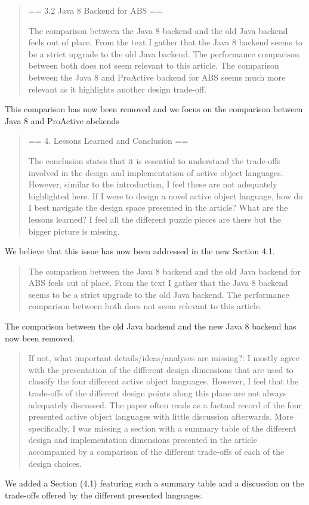 \documentclass{article}
\begin{document}
\begin{quote}
	== 3.2 Java 8 Backend for ABS ==

The comparison between the Java 8 backend and the old Java backend feels out of place. 
From the text I gather that the Java 8 backend seems to be a strict upgrade to the old 
Java backend. The performance comparison between both does not seem relevant to this 
article.
The comparison between the Java 8 and ProActive backend for ABS seems much more relevant 
as it highlights another design trade-off.
\end{quote}
This comparison has now been removed and we focus on the comparison between Java 8 and 
ProActive abckends

\begin{quote}
	== 4. Lessons Learned and Conclusion ==

The conclusion states that it is essential to understand the trade-offs involved in the 
design and implementation of active object languages. However, similar to the 
introduction, I feel these are not adequately highlighted here. If I were to design a 
novel active object language, how do I best navigate the design space presented in the 
article? What are the lessons learned? I feel all the different puzzle pieces are there 
but the bigger picture is missing.
\end{quote}
We believe that this issue has now been addressed in the new Section 4.1.


\begin{quote}
 The comparison between the Java 8 backend and the old Java backend 
for ABS feels out of place. From the text I gather that the Java 8 backend seems to be a 
strict upgrade to the old Java backend. The performance comparison between both does not 
seem relevant to this article.
\end{quote}
The comparison between the old Java backend and the new Java 8 backend has now been 
removed.

\begin{quote}
	If not, what important details/ideas/analyses are missing?: I mostly agree with the 
presentation of the different design dimensions that are used to classify the four 
different active object languages. However, I feel that the trade-offs of the different 
design points along this plane are not always adequately discussed. The paper often reads 
as a factual record of the four presented active object languages with little discussion 
afterwards. More specifically, I was missing a section with a summary table of the 
different design and implementation dimensions presented in the article accompanied by a 
comparison of the different trade-offs of each of the design choices.
\end{quote}
We added a Section (4.1) featuring such a summary table and a discussion on the 
trade-offs offered by the different presented languages.
\end{document}
